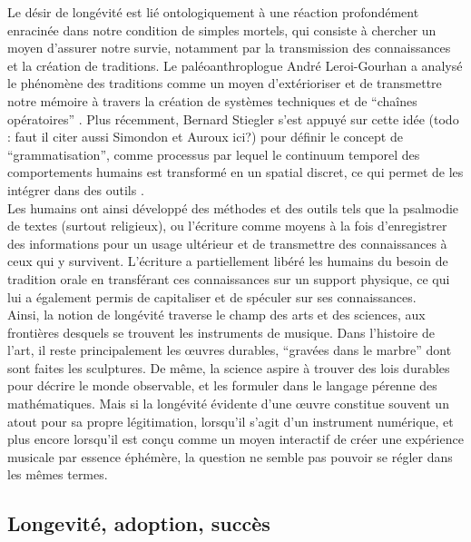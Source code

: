 \indent Le désir de longévité est lié ontologiquement à une réaction profondément enracinée dans notre condition de simples mortels, qui consiste à chercher un moyen d'assurer notre survie, notamment par la transmission des connaissances et la création de traditions. Le paléoanthroplogue André Leroi-Gourhan a analysé le phénomène des traditions comme un moyen d'extérioriser et de transmettre notre mémoire à travers la création de systèmes techniques et de ``chaînes opératoires'' \cite{leroi-gourhan_geste_1964}. Plus récemment, Bernard Stiegler s'est appuyé sur cette idée (todo : faut il citer aussi Simondon et Auroux ici?) pour définir le concept de ``grammatisation'', comme processus par lequel le continuum temporel des comportements humains est transformé en un spatial discret, ce qui permet de les intégrer dans des outils \cite{stiegler_for_2010}.\\
\indent Les humains ont ainsi développé des méthodes et des outils tels que la psalmodie de textes (surtout religieux), ou l'écriture comme moyens à la fois d'enregistrer des informations pour un usage ultérieur et de transmettre des connaissances à ceux qui y survivent. L'écriture a partiellement libéré les humains du besoin de tradition orale en transférant ces connaissances sur un support physique, ce qui lui a également permis de capitaliser et de spéculer sur ses connaissances.\\
\indent Ainsi, la notion de longévité traverse le champ des arts et des sciences, aux frontières desquels se trouvent les instruments de musique. Dans l'histoire de l'art, il reste principalement les œuvres durables, ``gravées dans le marbre'' dont sont faites les sculptures. De même, la science aspire à trouver des lois durables pour décrire le monde observable, et les formuler dans le langage pérenne des mathématiques. Mais si la longévité évidente d'une œuvre constitue souvent un atout pour sa propre légitimation, lorsqu'il s'agit d'un instrument numérique, et plus encore lorsqu'il est conçu comme un moyen interactif de créer une expérience musicale par essence éphémère, la question ne semble pas pouvoir se régler dans les mêmes termes.\\

	
\subsection{Longevité, adoption, succès}

